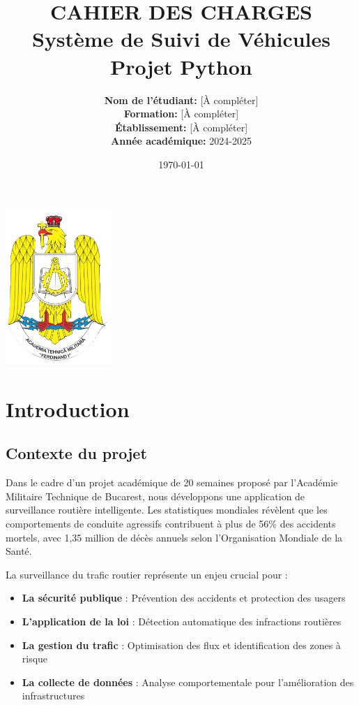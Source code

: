\documentclass[12pt,a4paper]{article}
\title{
    \vspace{-2cm}
    \Huge\textbf{CAHIER DES CHARGES}\\
    \vspace{0.5cm}
    \Large Système de Suivi de Véhicules\\
    \vspace{0.3cm}
    \large Projet Python
}
\author{
    \textbf{Nom de l'étudiant:} [À compléter]\\
    \textbf{Formation:} [À compléter]\\
    \textbf{Établissement:} [À compléter]\\
    \textbf{Année académique:} 2024-2025
}
\date{\today}
\begin{document}
\maketitle
\thispagestyle{empty}

\vfill

\begin{center}
    \includegraphics[width=0.3\textwidth]{logo_etablissement.png} %
\end{center}

\vfill

\newpage

\tableofcontents
\newpage

\section{Introduction}

\subsection{Contexte du projet}

Dans le cadre d'un projet académique de 20 semaines proposé par l'Académie Militaire Technique de Bucarest, nous développons une application de surveillance routière intelligente. Les statistiques mondiales révèlent que les comportements de conduite agressifs contribuent à plus de 56\% des accidents mortels, avec 1,35 million de décès annuels selon l'Organisation Mondiale de la Santé.

La surveillance du trafic routier représente un enjeu crucial pour :

\begin{itemize}
    \item \textbf{La sécurité publique} : Prévention des accidents et protection des usagers
    \item \textbf{L'application de la loi} : Détection automatique des infractions routières
    \item \textbf{La gestion du trafic} : Optimisation des flux et identification des zones à risque
    \item \textbf{La collecte de données} : Analyse comportementale pour l'amélioration des infrastructures
\end{itemize}
\end{document}
